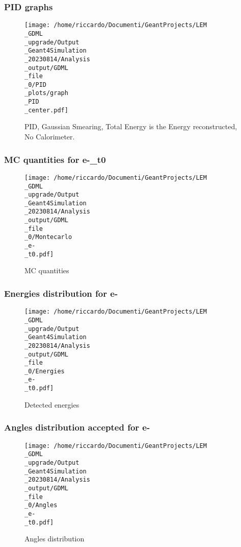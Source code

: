 \documentclass[8pt]{beamer}
\begin{document}
            \begin{frame}
                \frametitle{PID graphs}
            
        \begin{figure}[h]
            \centering
            \texttt{[image: /home/riccardo/Documenti/GeantProjects/LEM\\\_GDML\\\_upgrade/Output\\\_Geant4Simulation\\\_20230814/Analysis\\\_output/GDML\\\_file\\\_0/PID\\\_plots/graph\\\_PID\\\_center.pdf]}
            \caption{PID, Gaussian Smearing, Total Energy is the Energy reconstructed, No Calorimeter.}
        \end{figure}
        
            \end{frame}
            
            \begin{frame}
                \frametitle{MC quantities for e-\_t0}
            
        \begin{figure}[h]
            \centering
            \texttt{[image: /home/riccardo/Documenti/GeantProjects/LEM\\\_GDML\\\_upgrade/Output\\\_Geant4Simulation\\\_20230814/Analysis\\\_output/GDML\\\_file\\\_0/Montecarlo\\\_e-\\\_t0.pdf]}
            \caption{MC quantities}
        \end{figure}
        
            \end{frame}
            
            \begin{frame}
                \frametitle{Energies distribution for e-}
            
        \begin{figure}[h]
            \centering
            \texttt{[image: /home/riccardo/Documenti/GeantProjects/LEM\\\_GDML\\\_upgrade/Output\\\_Geant4Simulation\\\_20230814/Analysis\\\_output/GDML\\\_file\\\_0/Energies\\\_e-\\\_t0.pdf]}
            \caption{Detected energies}
        \end{figure}
        
            \end{frame}
            
            \begin{frame}
                \frametitle{Angles distribution accepted for e-}
            
        \begin{figure}[h]
            \centering
            \texttt{[image: /home/riccardo/Documenti/GeantProjects/LEM\\\_GDML\\\_upgrade/Output\\\_Geant4Simulation\\\_20230814/Analysis\\\_output/GDML\\\_file\\\_0/Angles\\\_e-\\\_t0.pdf]}
            \caption{Angles distribution}
        \end{figure}
        
            \end{frame}
            
\end{document}
